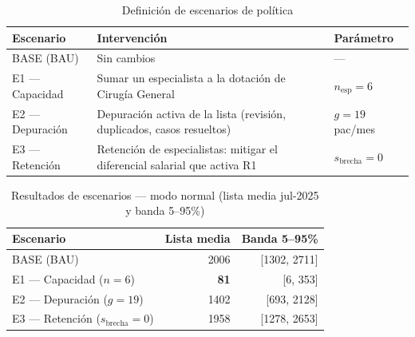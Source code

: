 \documentclass[12pt,a4paper]{article}
\begin{document}
\begin{table}[H]
  \centering
  \caption{Definición de escenarios de política}
  \label{tab:escenarios_def}
  \begin{tabularx}{\textwidth}{@{}p{4.2cm}Xp{3.2cm}@{}}
    \toprule
    \rowcolor{azulDS!15}
    \textbf{Escenario} & \textbf{Intervención}                                                     & \textbf{Parámetro} \\
    \midrule
    BASE (BAU)         & Sin cambios                                                               & ---                \\[3pt]
    E1 — Capacidad     & Sumar un especialista a la dotación de Cirugía General
                       & $n_{\text{esp}} = 6$                                                                           \\[3pt]
    E2 — Depuración    & Depuración activa de la lista (revisión, duplicados, casos resueltos)
                       & $g = 19$ pac/mes                                                                               \\[3pt]
    E3 — Retención     & Retención de especialistas: mitigar el diferencial salarial que activa R1
                       & $s_{\text{brecha}} = 0$                                                                        \\
    \bottomrule
  \end{tabularx}
\end{table}

\begin{table}[H]
  \centering
  \caption{Resultados de escenarios — modo normal (lista media jul-2025 y banda 5--95\%)}
  \label{tab:escenarios_res}
  \begin{tabular}{@{}lrr@{}}
    \toprule
    \rowcolor{azulDS!15}
    \textbf{Escenario}                     & \textbf{Lista media} & \textbf{Banda 5--95\%} \\
    \midrule
    BASE (BAU)                             & 2006                 & [1302, 2711]           \\
    E1 — Capacidad ($n=6$)                 & \textbf{81}          & [6, 353]               \\
    E2 — Depuración ($g=19$)               & 1402                 & [693, 2128]            \\
    E3 — Retención ($s_{\text{brecha}}=0$) & 1958                 & [1278, 2653]           \\
    \bottomrule
  \end{tabular}
\end{table}
\end{document}
